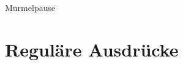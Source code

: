         
    
        
        



\begin{frame}[standout]
  Murmelpause
\end{frame}

\section{Reguläre Ausdrücke}

